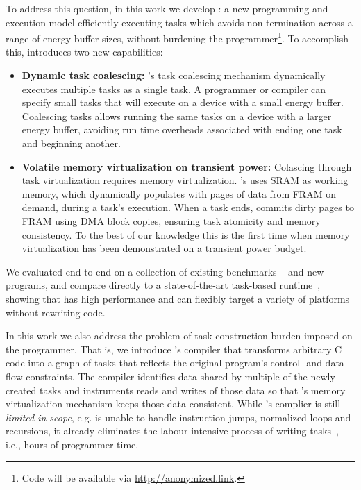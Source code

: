To address this question, in this work we develop {\bf \sys}: a new programming and execution model efficiently executing tasks which avoids non-termination across a range of energy buffer sizes, without burdening the programmer\footnote{Code will be available via \href{http://anonymized.link}{http://anonymized.link}.}. To accomplish this, \sys introduces two new capabilities: 

\begin{itemize}
	\item {\bf Dynamic task coalescing:} \sys's task coalescing mechanism dynamically executes multiple tasks as a single task. A programmer or compiler can specify small tasks that will execute on a device with a small energy buffer. Coalescing tasks allows running the same tasks on a device with a larger energy buffer, avoiding run time overheads associated with ending one task and beginning another.
	\item {\bf Volatile memory virtualization on transient power:} Colascing through task virtualization requires memory virtualization. \sys's uses SRAM as working memory, which \sys dynamically populates with pages of data from FRAM on demand, during a task's execution. When a task ends, \sys commits dirty pages to FRAM using DMA block copies, ensuring task atomicity and memory consistency. To the best of our knowledge this is the first time when memory virtualization has been demonstrated on a transient power budget.
\end{itemize}

We evaluated \sys end-to-end on a collection of existing benchmarks ~\cite{chain} and new programs, and compare directly to a state-of-the-art task-based runtime~\cite{chain}, showing that \sys has high performance and can flexibly target a variety of platforms without rewriting code. 

In this work we also address the problem of task construction burden imposed on the programmer. That is, we introduce \sys's compiler that transforms arbitrary C code into a graph of tasks that reflects the original program's control- and data-flow constraints. The compiler identifies data shared by multiple of the newly created tasks and instruments reads and writes of those data so that \sys's memory virtualization mechanism keeps those data consistent. While \sys's complier is still \emph{limited in scope}, e.g. is unable to handle instruction jumps, normalized loops and recursions, it already eliminates the labour-intensive process of writing tasks~\cite{chain,alpaca}, i.e., hours of programmer time.

